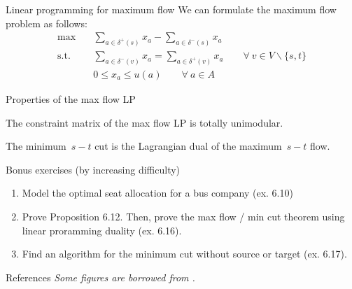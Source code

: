 \documentclass{beamer}
\begin{document}
\begin{frame}{Linear programming for maximum flow} \pause
  We can formulate the maximum flow problem as follows: \pause
  \begin{align*}
    \max \quad & \sum_{a \in \delta^+(s)} x_a - \sum_{a \in \delta^-(s)} x_a \\
    \mathrm{s.t.} \quad &
      \sum_{a \in \delta^-(v)} x_a = \sum_{a \in \delta^+(v)} x_a \quad \quad \forall~ v \in V \backslash \{s, t\} \\
      & 0 \leq x_a \leq u(a) \quad \quad \forall~ a \in A
  \end{align*}
\end{frame}

\begin{frame}[t]{Properties of the max flow LP} \pause
  \begin{proposition}[6.11]
    The constraint matrix of the max flow LP is totally unimodular.
  \end{proposition}
  
  \vfill \pause

  \begin{proposition}[6.12]
    The minimum~$s-t$ cut is the Lagrangian dual of the maximum~$s-t$ flow.
  \end{proposition}
  
  \vfill
\end{frame}

\begin{frame}{Bonus exercises (by increasing difficulty)} \pause
  \begin{enumerate}
    \item Model the optimal seat allocation for a bus company (ex. 6.10)
    \item Prove Proposition 6.12. Then, prove the max flow / min cut theorem using linear proramming duality (ex. 6.16).
    \item Find an algorithm for the minimum cut without source or target (ex. 6.17).
  \end{enumerate}
\end{frame}

\begin{frame}{References}
  \textit{\small Some figures are borrowed from \cite{gaubertRechercheOperationnelleAspects2016}.}
  \medskip
 \tiny
 \renewcommand{\section}[2]{\vskip 0.05em}
 
\end{frame}
\end{document}
